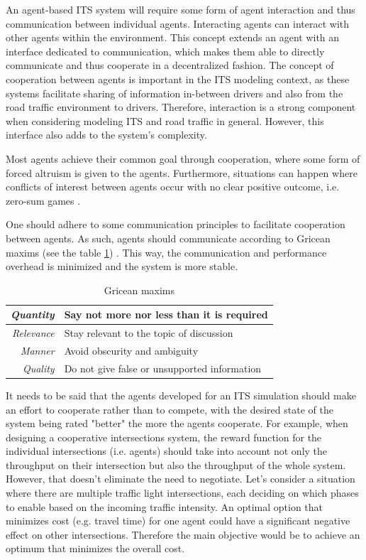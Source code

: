 \documentclass[0main.tex]{subfiles}
\begin{document}
An agent-based ITS system will require some form of agent interaction and
thus communication between individual agents. Interacting agents can interact with
other agents within the environment. This concept extends an agent with an interface dedicated
to communication, which makes them able to directly communicate and thus cooperate in a
decentralized fashion. The concept of cooperation between agents is important in the ITS
modeling context, as these systems facilitate sharing of information in-between drivers and also
from the road traffic environment to drivers. Therefore, interaction is a strong component when
considering modeling ITS and road traffic in general. However, this interface also adds to the
system's complexity.

Most agents achieve their common goal through cooperation, where some form of forced altruism
is given to the agents. Furthermore, situations can happen where conflicts of interest between
agents occur with no clear positive outcome, i.e. zero-sum games
\cite{ParasumannaGokulan2010}.

One should adhere to some communication principles to facilitate cooperation between agents. As
such, agents should communicate according to Gricean maxims (see the table \ref{maxims})
\cite{Shoham}. This way, the communication and performance overhead is minimized and the system 
is more stable. 


\begin{table}[htbp]
    \renewcommand{\arraystretch}{1.7}
    \setlength{\tabcolsep}{1em}
    \caption{Gricean maxims}
    \centering\begin{tabular}{>{\itshape}rl}
       \toprule
       Quantity & Say not more nor less than it is required \\ 
       \midrule
       Relevance &  Stay relevant to the topic of discussion \\
       \midrule
       Manner & Avoid obscurity and ambiguity \\ 
       \midrule
       Quality & Do not give false or unsupported information \\
       \bottomrule
    \end{tabular}
    \label{maxims}
\end{table}

It needs to be said that the agents developed for an ITS simulation should make an effort to
cooperate rather than to compete, with the desired state of the system being rated "better"
the more the agents cooperate.  For example, when designing a cooperative intersections system,
the reward function for the individual intersections (i.e. agents) should take into account not
only the throughput on their intersection but also the throughput of the whole system. However,
that doesn't eliminate the need to negotiate. Let's consider a situation where there are multiple
traffic light intersections, each deciding on which phases to enable based on the incoming
traffic intensity.  An optimal option that minimizes cost (e.g. travel time) for one agent
could have a significant negative effect on other intersections. Therefore the main objective
would be to achieve an optimum that minimizes the overall cost.
\end{document}
